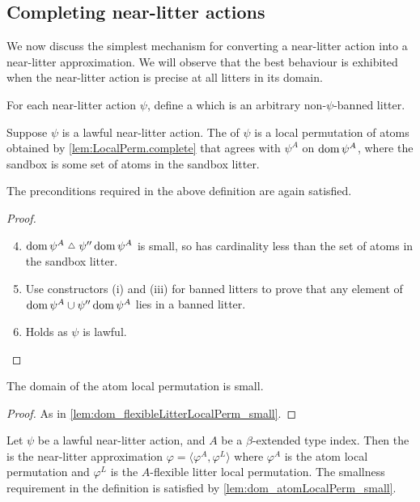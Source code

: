 \subsection{Completing near-litter actions}
We now discuss the simplest mechanism for converting a near-litter action into a near-litter approximation.
We will observe that the best behaviour is exhibited when the near-litter action is precise at all litters in its domain.

\begin{definition}
    For each near-litter action \( \psi \), define a  which is an arbitrary non-\( \psi \)-banned litter.
\end{definition}
\begin{definition}
    Suppose \( \psi \) is a lawful near-litter action.
    The  of \( \psi \) is a local permutation of atoms obtained by \cref{lem:LocalPerm.complete} that agrees with \( \psi^A \) on \( \operatorname{dom} \psi^A \), where the sandbox is some set of atoms in the sandbox litter.
\end{definition}
\begin{lemma}
    The preconditions required in the above definition are again satisfied.
\end{lemma}
\begin{proof}
    \begin{enumerate}
        \setcounter{enumi}{3}
        \item \( \dom \psi^A \symmdiff \psi '' \dom \psi^A \) is small, so has cardinality less than the set of atoms in the sandbox litter.
        \item Use constructors (i) and (iii) for banned litters to prove that any element of \( \operatorname{dom} \psi^A \cup \psi '' \operatorname{dom} \psi^A \) lies in a banned litter.
        \item Holds as \( \psi \) is lawful.
    \end{enumerate}
\end{proof}
\begin{lemma}
    \label{lem:dom_atomLocalPerm_small}
    The domain of the atom local permutation is small.
\end{lemma}
\begin{proof}
    As in \cref{lem:dom_flexibleLitterLocalPerm_small}.
\end{proof}
\begin{definition}
    Let \( \psi \) be a lawful near-litter action, and \( A \) be a \( \beta \)-extended type index.
    Then the  is the near-litter approximation \( \varphi = \langle \varphi^A, \varphi^L \rangle \) where \( \varphi^A \) is the atom local permutation and \( \varphi^L \) is the \( A \)-flexible litter local permutation.
    The smallness requirement in the definition is satisfied by \cref{lem:dom_atomLocalPerm_small}.
\end{definition}
